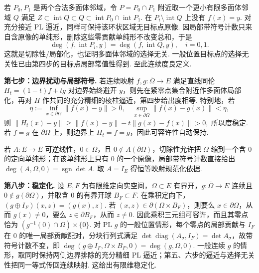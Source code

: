 \begin{FAProof}
若 \(\displaystyle P_0,P_1\) 是两个合法多面体邻域，令 \(\displaystyle P=P_0\cap P_1\) 附近取一个更小有限多面体邻域 \(\displaystyle Q\) 满足 \(\displaystyle Z\subset\operatorname{int}Q\subset Q\subset\operatorname{int}P_0\cap\operatorname{int}P_1\). 在 \(\displaystyle P_i\setminus\operatorname{int}Q\) 上没有 \(\displaystyle f(x)=y\). 对充分接近 PL 逼近，同样可保持该环状区域无目标点原像. 因局部带符号计数只来自含原像的单纯形，删除这些零贡献单纯形不改变总和，于是
\[
\deg(f,\operatorname{int}P_i,y)
=
\deg(f,\operatorname{int}Q,y),
\quad i=0,1.
\]
这就是切除性/局部化，也证明多面体邻域的选择无关. 一般位置目标点的选择无关性已由第四步的目标点局部常值性得到. 至此连续度良定义.

\textbf{第七步：边界扰动与局部符号.} 若连续映射 \(\displaystyle f,g:\overline\Omega\to E\) 满足直线同伦 \(\displaystyle H_t=(1-t)f+tg\) 对边界始终避开 \(\displaystyle y\)，则先在紧零点集合附近作多面体局部化，再对 \(\displaystyle H\) 作共同的充分精细的棱柱逼近，第四步给出度相等. 特别地，若
\[
\eta
:=
\inf_{x\in\partial\Omega}\|f(x)-y\|>0,
\quad
\sup_{x\in\partial\Omega}\|f(x)-g(x)\|<\eta,
\]
则
\(\displaystyle \|H_t(x)-y\| \geqslant \|f(x)-y\|-t\|g(x)-f(x)\|>0,\)
所以度稳定. 若 \(\displaystyle f=g\) 在 \(\displaystyle\partial\Omega\) 上，则边界上 \(\displaystyle H_t=f=g\)，因此可容许性自动保持.

若 \(\displaystyle A:E\to E\) 可逆线性，\(\displaystyle0\in\Omega\)，且 \(\displaystyle0\notin A(\partial\Omega)\)，切除性允许把 \(\displaystyle\Omega\) 缩到一个含 \(\displaystyle0\) 的定向单纯形；在该单纯形上只有 \(\displaystyle0\) 的一个原像，局部带符号计数直接给出
\(\displaystyle \deg(A,\Omega,0)=\operatorname{sgn}\det A.\)
取 \(\displaystyle A=I_E\) 得恒等映射规范化依据.

\textbf{第八步：稳定化.} 设 \(\displaystyle E,F\) 为有限维定向实空间，\(\displaystyle\Omega\subset E\) 有界开，\(\displaystyle g:\overline\Omega\to E\) 连续且 \(\displaystyle0\notin g(\partial\Omega)\)，并取含 \(\displaystyle0\) 的有界开球 \(\displaystyle B_F\subset F\). 在乘积定向下，\(\displaystyle(g\oplus I_F)(x,z)=(g(x),z)\). 若 \(\displaystyle(x,z)\in\partial(\Omega\times B_F)\)，则要么 \(\displaystyle x\in\partial\Omega\)，从而 \(\displaystyle g(x)\neq0\)，要么 \(\displaystyle z\in\partial B_F\)，从而 \(\displaystyle z\neq0\). 因此乘积三元组可容许，而且其零点恰为 \(\displaystyle(g^{-1}(0)\cap\Omega)\times\{0\}\). 对 PL \(\displaystyle g\) 的一般位置情形，每个零点的局部贡献与 \(\displaystyle I_F\) 在 \(\displaystyle0\) 的唯一局部贡献配对，分块行列式满足 \(\displaystyle\det\operatorname{diag}(A_{\sigma},I_F)=\det A_{\sigma}\)，故带符号计数不变，即
\(\displaystyle \deg(g\oplus I_F,\Omega\times B_F,0) = \deg(g,\Omega,0).\)
一般连续 \(\displaystyle g\) 的情形，取同时保持两侧边界排除的充分精细 PL 逼近；第五、六步的逼近与选择无关性把同一等式传回连续映射. 这给出有限维稳定化.


\end{FAProof}

